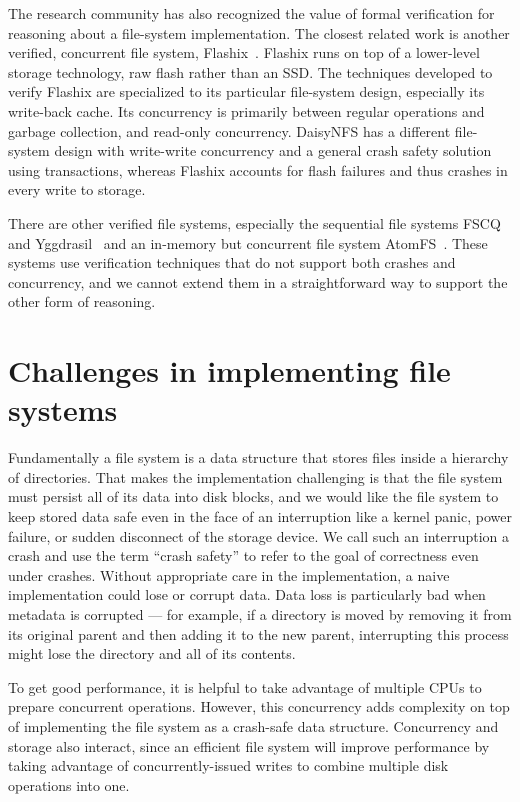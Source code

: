 The research community has also recognized the value of formal verification for
reasoning about a file-system implementation. The closest related work is
another verified, concurrent file system,
Flashix~\cite{bodenmuller:concurrent-flashix}. Flashix runs on top of a
lower-level storage technology, raw flash rather than an SSD. The techniques
developed to verify Flashix are specialized to its particular file-system
design, especially its write-back cache. Its concurrency is primarily between
regular operations and garbage collection, and read-only concurrency. DaisyNFS
has a different file-system design with write-write concurrency and a general
crash safety solution using transactions, whereas Flashix accounts for flash
failures and thus crashes in every write to storage.

There are other verified file systems, especially the sequential file systems
FSCQ~\cite{chen:fscq} and Yggdrasil~\cite{sigurbjarnarson:yggdrasil} and an
in-memory but concurrent file system AtomFS~\cite{zou:atomfs}. These systems use
verification techniques that do not support both crashes and concurrency, and we
cannot extend them in a straightforward way to support the other form of reasoning.

\section{Challenges in implementing file systems}

Fundamentally a file system is a data structure that stores files inside a
hierarchy of directories. That makes the implementation challenging is that the file system must persist all
of its data into disk blocks, and we would like the file system to keep
stored data safe even in the face of an interruption like a kernel panic,
power failure, or sudden disconnect of the storage device. We call such an
interruption a crash and use the term ``crash safety'' to refer to the goal of
correctness even under crashes. Without appropriate care in the implementation,
a naive implementation could lose or corrupt data. Data loss is particularly bad
when
metadata is corrupted --- for example, if a directory is moved by removing it
from its original parent and then adding it to the new parent, interrupting this
process might lose the directory and all of its contents.

To get good performance, it is helpful to take advantage of multiple CPUs to
prepare concurrent operations. However, this concurrency adds complexity on top
of implementing the file system as a crash-safe data structure. Concurrency and
storage also interact, since an efficient file system will improve performance
by taking advantage of concurrently-issued writes to combine multiple disk
operations into one.

